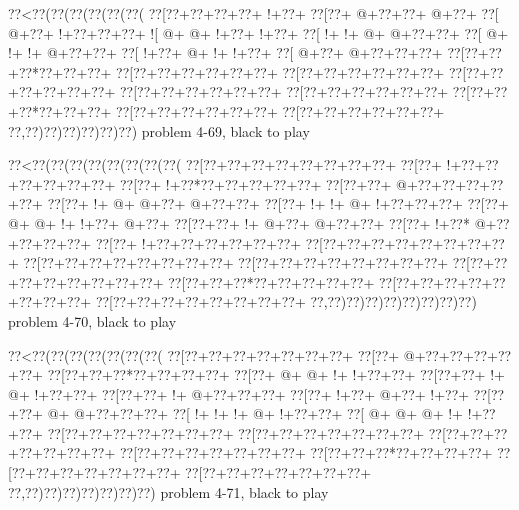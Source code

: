 \vbox{\vbox{\goo
\0??<\0??(\0??(\0??(\0??(\0??(\0??(
\0??[\0??+\0??+\0??+\0??+\- !+\0??+
\0??[\0??+\- @+\0??+\0??+\- @+\0??+
\0??[\- @+\0??+\- !+\0??+\0??+\0??+
\- ![\- @+\- @+\- !+\0??+\- !+\0??+
\0??[\- !+\- !+\- @+\- @+\0??+\0??+
\0??[\- @+\- !+\- !+\- @+\0??+\0??+
\0??[\- !+\0??+\- @+\- !+\- !+\0??+
\0??[\- @+\0??+\- @+\0??+\0??+\0??+
\0??[\0??+\0??+\0??*\0??+\0??+\0??+
\0??[\0??+\0??+\0??+\0??+\0??+\0??+
\0??[\0??+\0??+\0??+\0??+\0??+\0??+
\0??[\0??+\0??+\0??+\0??+\0??+\0??+
\0??[\0??+\0??+\0??+\0??+\0??+\0??+
\0??[\0??+\0??+\0??+\0??+\0??+\0??+
\0??[\0??+\0??+\0??*\0??+\0??+\0??+
\0??[\0??+\0??+\0??+\0??+\0??+\0??+
\0??[\0??+\0??+\0??+\0??+\0??+\0??+
\0??,\0??)\0??)\0??)\0??)\0??)\0??)
}
\hfil problem 4-69, black to play\hfil\break
}

\vbox{\vbox{\goo
\0??<\0??(\0??(\0??(\0??(\0??(\0??(\0??(\0??(
\0??[\0??+\0??+\0??+\0??+\0??+\0??+\0??+\0??+
\0??[\0??+\- !+\0??+\0??+\0??+\0??+\0??+\0??+
\0??[\0??+\- !+\0??*\0??+\0??+\0??+\0??+\0??+
\0??[\0??+\0??+\- @+\0??+\0??+\0??+\0??+\0??+
\0??[\0??+\- !+\- @+\- @+\0??+\- @+\0??+\0??+
\0??[\0??+\- !+\- !+\- @+\- !+\0??+\0??+\0??+
\0??[\0??+\- @+\- @+\- !+\- !+\0??+\- @+\0??+
\0??[\0??+\0??+\- !+\- @+\0??+\- @+\0??+\0??+
\0??[\0??+\- !+\0??*\- @+\0??+\0??+\0??+\0??+
\0??[\0??+\- !+\0??+\0??+\0??+\0??+\0??+\0??+
\0??[\0??+\0??+\0??+\0??+\0??+\0??+\0??+\0??+
\0??[\0??+\0??+\0??+\0??+\0??+\0??+\0??+\0??+
\0??[\0??+\0??+\0??+\0??+\0??+\0??+\0??+\0??+
\0??[\0??+\0??+\0??+\0??+\0??+\0??+\0??+\0??+
\0??[\0??+\0??+\0??*\0??+\0??+\0??+\0??+\0??+
\0??[\0??+\0??+\0??+\0??+\0??+\0??+\0??+\0??+
\0??[\0??+\0??+\0??+\0??+\0??+\0??+\0??+\0??+
\0??,\0??)\0??)\0??)\0??)\0??)\0??)\0??)\0??)
}
\hfil problem 4-70, black to play\hfil\break
}

\vbox{\vbox{\goo
\0??<\0??(\0??(\0??(\0??(\0??(\0??(\0??(
\0??[\0??+\0??+\0??+\0??+\0??+\0??+\0??+
\0??[\0??+\- @+\0??+\0??+\0??+\0??+\0??+
\0??[\0??+\0??+\0??*\0??+\0??+\0??+\0??+
\0??[\0??+\- @+\- @+\- !+\- !+\0??+\0??+
\0??[\0??+\0??+\- !+\- @+\- !+\0??+\0??+
\0??[\0??+\0??+\- !+\- @+\0??+\0??+\0??+
\0??[\0??+\- !+\0??+\- @+\0??+\- !+\0??+
\0??[\0??+\0??+\- @+\- @+\0??+\0??+\0??+
\0??[\- !+\- !+\- !+\- @+\- !+\0??+\0??+
\0??[\- @+\- @+\- @+\- !+\- !+\0??+\0??+
\0??[\0??+\0??+\0??+\0??+\0??+\0??+\0??+
\0??[\0??+\0??+\0??+\0??+\0??+\0??+\0??+
\0??[\0??+\0??+\0??+\0??+\0??+\0??+\0??+
\0??[\0??+\0??+\0??+\0??+\0??+\0??+\0??+
\0??[\0??+\0??+\0??*\0??+\0??+\0??+\0??+
\0??[\0??+\0??+\0??+\0??+\0??+\0??+\0??+
\0??[\0??+\0??+\0??+\0??+\0??+\0??+\0??+
\0??,\0??)\0??)\0??)\0??)\0??)\0??)\0??)
}
\hfil problem 4-71, black to play\hfil\break
}

